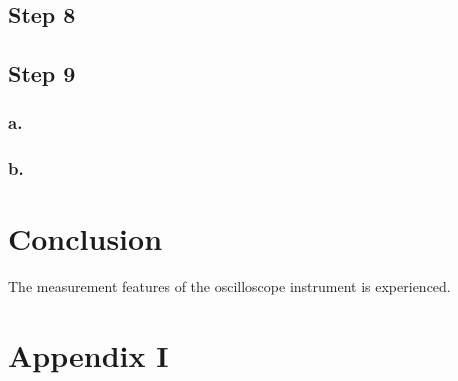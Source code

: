 \documentclass[letterpaper,12pt]{article}
\begin{document}
\subsection{Step 8}
\subsection{Step 9}
\subsubsection{a.}
\subsubsection{b.}


\section{Conclusion}
The measurement features of the oscilloscope instrument is experienced.
\section{Appendix I}


\begin{thebibliography}{99}


\end{thebibliography}
\end{document}
